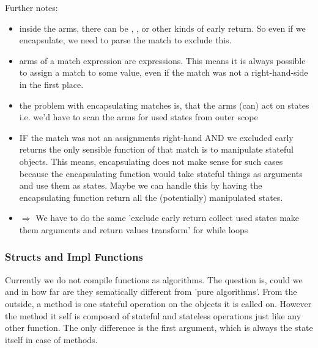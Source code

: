 Further notes:
\begin{itemize}
    \item inside the arms, there can be , ,  or other kinds of early return. So even if we encapsulate, we need to parse the match to exclude this.
    \item arms of a match expression are expressions. This means it is always possible to assign a match to some value, even if the match was not a right-hand-side in the first place.
    \item the problem with encapsulating matches is, that the arms (can) act on states i.e. we'd have to scan the arms for used states from outer scope 
    \item IF the match was not an assignments right-hand AND we excluded early returns the only sensible function of that match is to manipulate stateful objects. This means, encapsulating does not make sense for such cases because the encapsulating function would take stateful things as arguments and use them as states. Maybe we can handle this by having the encapsulating function return all the (potentially) manipulated states.
    \item[] $\Rightarrow$ We have to do the same 'exclude early return \means collect used states \means make them arguments and return values \means transform' for while loops
\end{itemize}

\subsubsection{Structs and Impl Functions}
Currently we do not compile  functions as algorithms. The question is, could we and in how far are they sematically different from 'pure algorithms'. From the outside, a method is one stateful operation on the objects it is called on. However the method it self is composed of stateful and stateless operations just like any other function. The only difference is the first argument, which is always the state itself in case of methods. 



